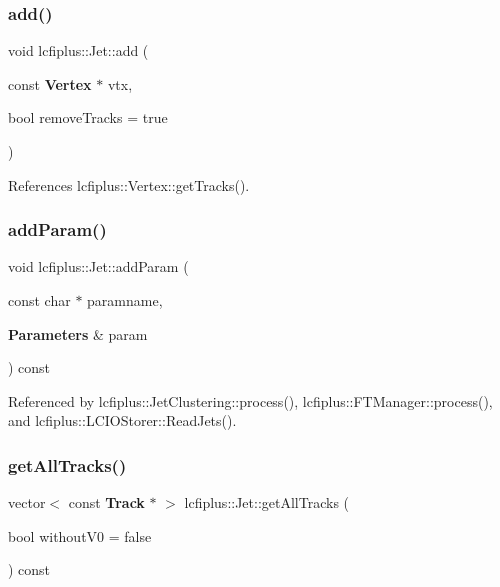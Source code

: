 \mbox{\label{classlcfiplus_1_1Jet_a85e856f5747e87812827e30f9a6ace1f}} 
\subsubsection{add()\hspace{0.1cm}{\footnotesize\ttfamily [4/4]}}
{\footnotesize\ttfamily void lcfiplus\+::\+Jet\+::add (\begin{DoxyParamCaption}\item[{const \textbf{ Vertex} $\ast$}]{vtx,  }\item[{bool}]{remove\+Tracks = {\ttfamily true} }\end{DoxyParamCaption})\hspace{0.3cm}{\ttfamily [inline]}}



References lcfiplus\+::\+Vertex\+::get\+Tracks().

\mbox{\label{classlcfiplus_1_1Jet_aa42615a4c1ab45dac25e186028042935}} 
\subsubsection{add\+Param()}
{\footnotesize\ttfamily void lcfiplus\+::\+Jet\+::add\+Param (\begin{DoxyParamCaption}\item[{const char $\ast$}]{paramname,  }\item[{\textbf{ Parameters} \&}]{param }\end{DoxyParamCaption}) const\hspace{0.3cm}{\ttfamily [inline]}}



Referenced by lcfiplus\+::\+Jet\+Clustering\+::process(), lcfiplus\+::\+F\+T\+Manager\+::process(), and lcfiplus\+::\+L\+C\+I\+O\+Storer\+::\+Read\+Jets().

\mbox{\label{classlcfiplus_1_1Jet_a3ac66ea5f7d58f9db7e8d143614128bb}} 
\subsubsection{get\+All\+Tracks()}
{\footnotesize\ttfamily vector$<$ const \textbf{ Track} $\ast$ $>$ lcfiplus\+::\+Jet\+::get\+All\+Tracks (\begin{DoxyParamCaption}\item[{bool}]{without\+V0 = {\ttfamily false} }\end{DoxyParamCaption}) const}



